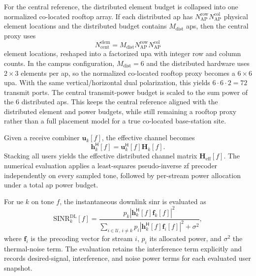 For the central reference, the distributed element budget is collapsed into one normalized co-located rooftop array. If each distributed \gls{ap} has $N_{\mathrm{AP}}^{\mathrm{row}}N_{\mathrm{AP}}^{\mathrm{col}}$ physical element locations and the distributed budget contains $M_{\mathrm{dist}}$ \glspl{ap}, then the central proxy uses
\begin{equation}
    N_{\mathrm{cent}}^{\mathrm{elem}} =
    M_{\mathrm{dist}} N_{\mathrm{AP}}^{\mathrm{row}} N_{\mathrm{AP}}^{\mathrm{col}}
\end{equation}
element locations, reshaped into a factorized \gls{upa} with integer row and column counts. In the campus configuration, $M_{\mathrm{dist}}=\num{6}$ and the distributed hardware uses $\num{2}\times\num{3}$ elements per \gls{ap}, so the normalized co-located rooftop proxy becomes a $\num{6}\times\num{6}$ \gls{upa}. With the same vertical/horizontal dual polarization, this yields $\num{6} \cdot \num{6} \cdot \num{2} = \num{72}$ transmit ports. The central transmit-power budget is scaled to the sum power of the \num{6} distributed \glspl{ap}. This keeps the central reference aligned with the distributed element and power budgets, while still remaining a rooftop proxy rather than a full placement model for a true co-located base-station site.

Given a receive combiner $\mathbf{u}_k[f]$, the effective channel becomes
\begin{equation}
    \mathbf{h}_k^{\mathsf{H}}[f] = \mathbf{u}_k^{\mathsf{H}}[f]\mathbf{H}_k[f].
\end{equation}
Stacking all users yields the effective distributed channel matrix $\mathbf{H}_{\mathrm{eff}}[f]$. The numerical evaluation applies a least-squares pseudo-inverse \gls{zf} precoder independently on every sampled tone, followed by per-stream power allocation under a total \gls{ap} power budget.

For \gls{ue} $k$ on tone $f$, the instantaneous downlink \gls{sinr} is evaluated as
\begin{equation}
    \mathrm{SINR}^{\mathrm{DL}}_k[f] =
    \frac{p_k \left|\mathbf{h}_k^{\mathsf{H}}[f]\mathbf{f}_k[f]\right|^2}
    {\sum_{i \in \mathcal{U},\, i \neq k} p_i \left|\mathbf{h}_k^{\mathsf{H}}[f]\mathbf{f}_i[f]\right|^2 + \sigma^2},
\end{equation}
where $\mathbf{f}_i$ is the precoding vector for stream $i$, $p_i$ its allocated power, and $\sigma^2$ the thermal-noise term. The evaluation retains the interference term explicitly and records desired-signal, interference, and noise power terms for each evaluated user snapshot.

